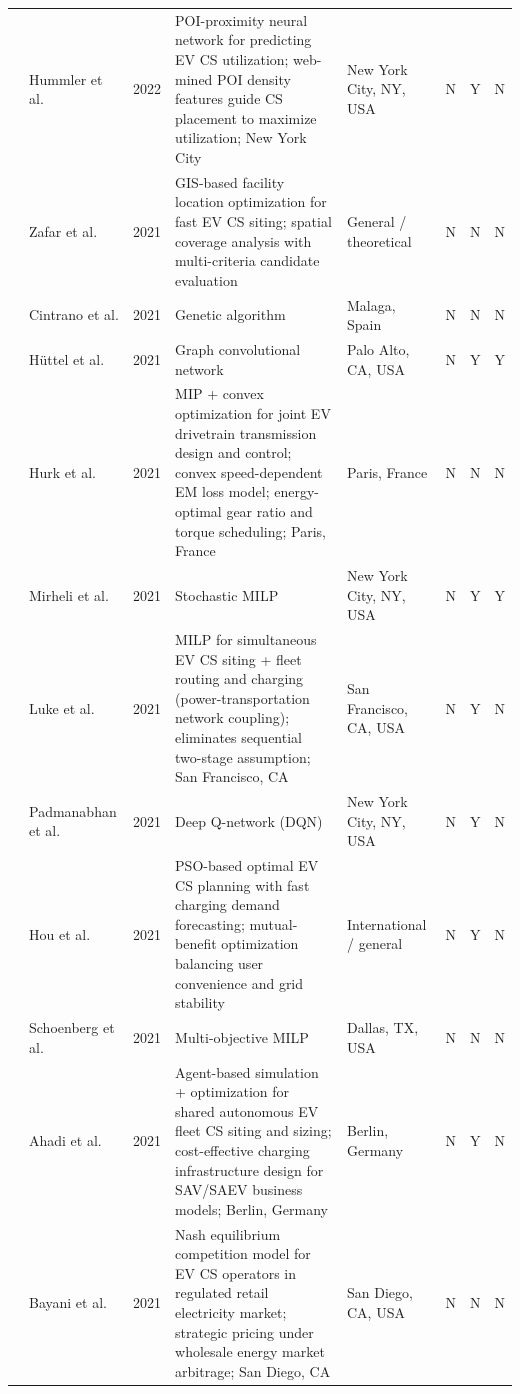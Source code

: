 \documentclass[letterpaper, 12pt, oneside, doublespacing]{Thesis}
\begin{document}
\begin{longtable}{L{0.9cm} L{1.8cm} L{0.7cm} L{2.5cm} L{2.1cm} L{0.7cm} L{0.7cm} L{0.7cm}}
\cite{web_mining_2022} & Hummler et al. & 2022 & POI-proximity neural network for predicting EV CS utilization; web-mined POI density features guide CS placement to maximize utilization; New York City & New York City, NY, USA & N & Y & N \\
\cite{a_gis-based_2021} & Zafar et al. & 2021 & GIS-based facility location optimization for fast EV CS siting; spatial coverage analysis with multi-criteria candidate evaluation & General {\slash} theoretical & N & N & N \\
\cite{citizen_centric_2021} & Cintrano et al. & 2021 & Genetic algorithm & Malaga, Spain & N & N & N \\
\cite{deep_spatio-temporal_2021} & H\"uttel et al. & 2021 & Graph convolutional network & Palo Alto, CA, USA & N & Y & Y \\
\cite{energy-optimal_design_2021} & Hurk et al. & 2021 & MIP + convex optimization for joint EV drivetrain transmission design and control; convex speed-dependent EM loss model; energy-optimal gear ratio and torque scheduling; Paris, France & Paris, France & N & N & N \\
\cite{hierarchical_optimization_2021} & Mirheli et al. & 2021 & Stochastic MILP & New York City, NY, USA & N & Y & Y \\
\cite{joint_optimization_2021} & Luke et al. & 2021 & MILP for simultaneous EV CS siting + fleet routing and charging (power-transportation network coupling); eliminates sequential two-stage assumption; San Francisco, CA & San Francisco, CA, USA & N & Y & N \\
\cite{optimal_placement_2021} & Padmanabhan et al. & 2021 & Deep Q-network (DQN) & New York City, NY, USA & N & Y & N \\
\cite{optimal_planning_2021} & Hou et al. & 2021 & PSO-based optimal EV CS planning with fast charging demand forecasting; mutual-benefit optimization balancing user convenience and grid stability & International {\slash} general & N & Y & N \\
\cite{reducing_waiting_2021} & Schoenberg et al. & 2021 & Multi-objective MILP & Dallas, TX, USA & N & N & N \\
\cite{siting_and_2021} & Ahadi et al. & 2021 & Agent-based simulation + optimization for shared autonomous EV fleet CS siting and sizing; cost-effective charging infrastructure design for SAV/SAEV business models; Berlin, Germany & Berlin, Germany & N & Y & N \\
\cite{strategic_competition_2021} & Bayani et al. & 2021 & Nash equilibrium competition model for EV CS operators in regulated retail electricity market; strategic pricing under wholesale energy market arbitrage; San Diego, CA & San Diego, CA, USA & N & N & N \\

\end{longtable}
\end{document}
